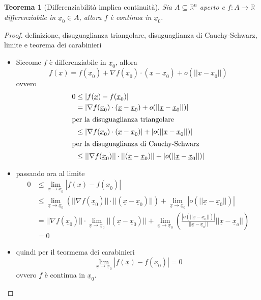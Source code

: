 \documentclass[12pt, a4paper]{article}
\theoremstyle{break}
\newtheorem{theorem}{Teorema} %
\begin{document}
\newpage
\begin{theorem} [Differenziabilità implica continuità]
	Sia $A \subseteq \mathbb{R}^n$ aperto e $f: A \to \mathbb{R}$
	differenziabile in $\underline{x}_0 \in A$, allora $f$ è continua in
	$\underline{x}_0$.
\end{theorem}
\begin{proof} definizione, disuguaglianza triangolare, disuguaglianza di
	Cauchy-Schwarz, limite e teorema dei carabinieri
	\begin{itemize}
		\item Siccome $f$ è differenziabile in $\underline{x}_0$, allora
		      \[
			      f(\underline{x}) = f(\underline{x}_0) + \nabla f
			      (\underline{x}_0) \cdot (\underline{x} - \underline{x}_0)
			      + o(||\underline{x} - \underline{x}_0||)
		      \]
		      ovvero
		      \begin{align*}
			      0 & \leq |f(\underline{x}) - f(\underline{x}_0)|               \\
			        & = |\nabla f
			      (\underline{x}_0) \cdot (\underline{x} - \underline{x}_0) +
			      o(||\underline{x} - \underline{x}_0||)|                        \\
			      \intertext{per la disuguaglianza triangolare}
			        & \leq |\nabla f (\underline{x}_0) \cdot (\underline{x} -
			      \underline{x}_0)| + |o(||\underline{x} - \underline{x}_0||)|   \\
			      \intertext{per la disuguaglianza di Cauchy-Schwarz}
			        & \leq ||\nabla f (\underline{x}_0)|| \cdot ||(\underline{x}
			      - \underline{x}_0)|| + |o(||\underline{x} - \underline{x}_0||)|
		      \end{align*}
		\item passando ora al limite
		      \begin{align*}
			      0 & \leq \lim_{\underline{x} \to \underline{x}_0}
			      |f(\underline{x}) - f(\underline{x}_0)|                         \\
			        & \leq \lim_{\underline{x} \to \underline{x}_0} \left(
			      ||\nabla f (\underline{x}_0)|| \cdot ||(\underline{x} -
			      \underline{x}_0)|| \right) + \lim_{\underline{x} \to
			      \underline{x}_0} |o(||\underline{x} - \underline{x}_0||)|       \\
			        & = ||\nabla f (\underline{x}_0)|| \cdot  \lim_{\underline{x}
				      \to \underline{x}_0} ||(\underline{x} - \underline{x}_0)|| +
			      \lim_{\underline{x} \to \underline{x}_0} \left(
			      \frac{|o(||\underline{x} - \underline{x}_0||)|}
				      {||\underline{x} - \underline{x}_o||}||\underline{x} -
			      \underline{x}_o|| \right)                                       \\
			        & = 0
		      \end{align*}
		\item quindi per il teormema dei carabinieri
		      \[
			      \lim_{\underline{x} \to \underline{x}_0} | f(\underline{x}) -
			      f(\underline{x}_0) | = 0
		      \]
		      ovvero $f$ è continua in $\underline{x}_0$.
	\end{itemize}
\end{proof}
\end{document}
